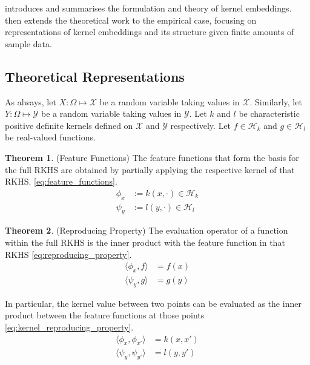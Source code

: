 \documentclass[twoside]{article} \usepackage{aistats2017}
\theoremstyle{definition}
\newtheorem{theorem}{Theorem}[section]
\newcommand{\rv}[1]{{#1}}
\newcommand{\inner}[2]{{\langle #1, #2 \rangle}}
\newcommand{\Hk}{\mathcal{H}_{k}}
\newcommand{\Hl}{\mathcal{H}_{l}}
\begin{document}
	 introduces and summarises the formulation and theory of kernel embeddings.  then extends the theoretical work to the empirical case, focusing on representations of kernel embeddings and its structure given finite amounts of sample data.
	
	\subsection{Theoretical Representations}
	\label{sec:kernel_embeddings:theoretical_representation}
	
		As always, let $\rv{X} : \Omega \mapsto \mathcal{X}$ be a random variable taking values in $\mathcal{X}$. Similarly, let $\rv{Y} : \Omega \mapsto \mathcal{Y}$ be a random variable taking values in $\mathcal{Y}$. Let $k$ and $l$ be characteristic positive definite kernels defined on $\mathcal{X}$ and $\mathcal{Y}$ respectively. Let $f \in \Hk$ and $g \in \Hl$ be real-valued functions.
			
		\begin{theorem} \label{thm:feature_functions}
			(Feature Functions)
			The feature functions that form the basis for the full RKHS are obtained by partially applying the respective kernel of that RKHS. \eqref{eq:feature_functions}.
			\begin{equation}
			\begin{aligned}
				\phi_{x} &:= k(x, \cdot) \in \Hk \\
				\psi_{y} &:= l(y, \cdot) \in \Hl
			\label{eq:feature_functions}
			\end{aligned}
			\end{equation}
		\end{theorem}
	
		\begin{theorem} \label{thm:reproducing_property}
			(Reproducing Property)
			The evaluation operator of a function within the full RKHS is the inner product with the feature function in that RKHS \eqref{eq:reproducing_property}.
			\begin{equation}
			\begin{aligned}
				\inner{\phi_{x}}{f} &= f(x) \\
				\inner{\psi_{y}}{g} &= g(y)
			\label{eq:reproducing_property}
			\end{aligned}
			\end{equation}
			
			In particular, the kernel value between two points can be evaluated as the inner product between the feature functions at those points \eqref{eq:kernel_reproducing_property}.
			\begin{equation}
			\begin{aligned}
				\inner{\phi_{x}}{\phi_{x'}} &= k(x, x') \\
				\inner{\psi_{y}}{\psi_{y'}} &= l(y, y') \\
			\label{eq:kernel_reproducing_property}
			\end{aligned}
			\end{equation}
		\end{theorem}
	
\end{document}
